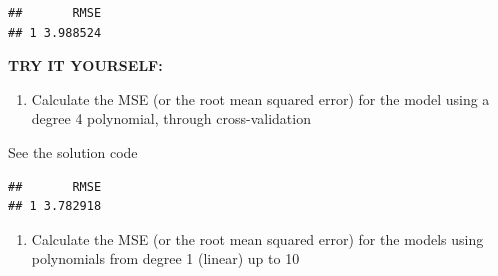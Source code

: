 \documentclass[
]{book}
\newenvironment{Shaded}{\begin{snugshade}}{\end{snugshade}}
\newcommand{\AttributeTok}[1]{\textcolor[rgb]{0.13,0.29,0.53}{#1}}
\newcommand{\CommentTok}[1]{\textcolor[rgb]{0.56,0.35,0.01}{\textit{#1}}}
\newcommand{\DecValTok}[1]{\textcolor[rgb]{0.00,0.00,0.81}{#1}}
\newcommand{\FunctionTok}[1]{\textcolor[rgb]{0.13,0.29,0.53}{\textbf{#1}}}
\newcommand{\NormalTok}[1]{#1}
\newcommand{\OtherTok}[1]{\textcolor[rgb]{0.56,0.35,0.01}{#1}}
\newcommand{\SpecialCharTok}[1]{\textcolor[rgb]{0.81,0.36,0.00}{\textbf{#1}}}
\newcommand{\StringTok}[1]{\textcolor[rgb]{0.31,0.60,0.02}{#1}}
\providecommand{\tightlist}{%
  \setlength{\itemsep}{0pt}\setlength{\parskip}{0pt}}
\begin{document}
\begin{verbatim}
##       RMSE
## 1 3.988524
\end{verbatim}

\textbf{TRY IT YOURSELF:}

\begin{enumerate}
\def\labelenumi{\arabic{enumi})}
\tightlist
\item
  Calculate the MSE (or the root mean squared error) for the model using
  a degree 4 polynomial, through cross-validation
\end{enumerate}

See the solution code

\begin{Shaded}
\end{Shaded}

\begin{verbatim}
##       RMSE
## 1 3.782918
\end{verbatim}

\begin{enumerate}
\def\labelenumi{\arabic{enumi})}
\setcounter{enumi}{1}
\tightlist
\item
  Calculate the MSE (or the root mean squared error) for the models using
  polynomials from degree 1 (linear) up to 10
\end{enumerate}
\end{document}
